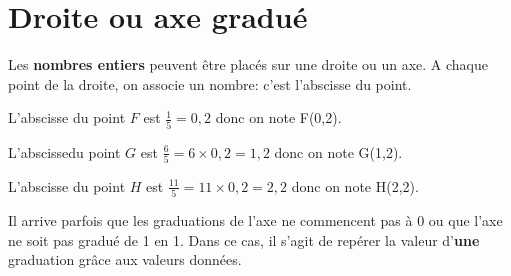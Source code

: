 
\section{Droite ou axe gradué}

\begin{aconnaitre}
Les \textbf{\textcolor{C2}{nombres entiers}}
peuvent être placés sur une droite ou un axe. A chaque point de la droite, on associe un nombre: c'est l'abscisse du point.
\end{aconnaitre}
\begin{methode*1}
	\begin{exemple*1}

\vspace{0.5cm}

 
 L'abscisse du point $F$ est $\frac{1}{5}=0,2$ donc on note F(0,2).
 
 L'abscissedu point $G$ est $\frac{6}{5}=6 \times0,2=1,2$ donc on note G(1,2).
 
 L'abscisse du point $H$ est $\frac{11}{5}=11 \times0,2=2,2$ donc on note H(2,2).
   
 

\end{exemple*1}

\begin{remarque}
Il arrive parfois que les graduations de l'axe ne commencent pas à 0 ou que l'axe ne soit pas gradué de 1 en 1. Dans ce cas, il s'agit de repérer la valeur d'\textbf{une} graduation grâce aux valeurs données.
\end{remarque}


\end{methode*1}
